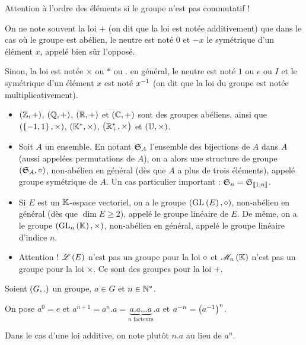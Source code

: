Attention à l'ordre des éléments si le groupe n'est pas commutatif !

On ne note souvent la loi \(+\) (on dit que la loi est notée additivement) que dans le cas où le groupe est abélien, le neutre est noté \(0\) et \(-x\) le symétrique d'un élément \(x\), appelé bien sûr l'opposé.

Sinon, la loi est notée \(\times\) ou \(*\) ou \(.\) en général, le neutre est noté \(1\) ou \(e\) ou \(I\) et le symétrique d'un élément \(x\) est noté \(x\inv\) (on dit que la loi du groupe est notée multiplicativement).

\begin{ex}
\begin{itemize}
    \item \(\groupe{\Z}\), \(\groupe{\Q}\), \(\groupe{\R}\) et \(\groupe{\C}\) sont des groupes abéliens, ainsi que \(\groupe{\accol{-1,1}}[\times]\), \(\groupe{\Ks}[\times]\), \(\groupe{\Rps}[\times]\) et \(\groupe{\U}[\times]\). \\
    \item Soit \(A\) un ensemble. En notant \(\S{A}\) l'ensemble des bijections de \(A\) dans \(A\) (aussi appelées permutations de \(A\)), on a alors une structure de groupe \(\groupe{\S{A}}[\rond]\), non-abélien en général (dès que \(A\) a plus de trois éléments), appelé groupe symétrique de \(A\). Un cas particulier important : \(\S{n}=\S{\interventierii{1}{n}}\). \\
    \item Si \(E\) est un \(\K\)-espace vectoriel, on a le groupe \(\groupe{\GL{}[E]}[\rond]\), non-abélien en général (dès que \(\dim E\geq2\)), appelé le groupe linéaire de \(E\). De même, on a le groupe \(\groupe{\GL{n}[\K]}[\times]\), non-abélien en général, appelé le groupe linéaire d'indice \(n\). \\
    \item Attention ! \(\Lendo{E}\) n'est pas un groupe pour la loi \(\rond\) et \(\M{n}[\K]\) n'est pas un groupe pour la loi \(\times\). Ce sont des groupes pour la loi \(+\).
\end{itemize}
\end{ex}

Soient \(\groupe{G}[.]\) un groupe, \(a\in G\) et \(n\in\Ns\).

On pose \(a^0=e\) et \(a^{n+1}=a^n.a=\underbrace{a.a\dots a}_{n\text{ facteurs}}.a\) et \(a^{-n}=\paren{a\inv}^n\).

Dans le cas d'une loi additive, on note plutôt \(n.a\) au lieu de \(a^n\).

